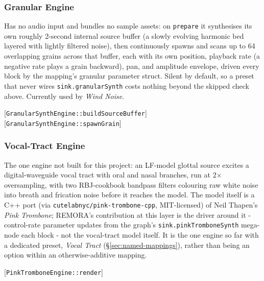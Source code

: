 \documentclass[sigconf,nonacm]{acmart}
\newcommand{\coderef}[1]{{\small [#1]}}
\newcommand{\preset}[1]{\textit{#1}}
\begin{document}
\subsubsection*{Granular Engine}
Has no audio input and bundles no sample assets: on \texttt{prepare} it synthesises its own
roughly 2-second internal source buffer (a slowly evolving harmonic bed layered with lightly
filtered noise), then continuously spawns and scans up to 64 overlapping grains across that buffer,
each with its own position, playback rate (a negative rate plays a grain backward), pan, and
amplitude envelope, driven every block by the mapping's granular parameter struct. Silent by
default, so a preset that never wires \texttt{sink.granularSynth} costs nothing beyond the skipped
check above. Currently used by \preset{Wind Noise}.
\begin{flushright}
\coderef{\texttt{GranularSynthEngine::buildSourceBuffer}}
\coderef{\texttt{GranularSynthEngine::spawnGrain}}
\end{flushright}

\subsubsection*{Vocal-Tract Engine}
The one engine not built for this project: an LF-model glottal source excites a digital-waveguide
vocal tract with oral and nasal branches, run at 2$\times$ oversampling, with two RBJ-cookbook
bandpass filters colouring raw white noise into breath and frication noise before it reaches the
model. The model itself is a C++ port (via \texttt{cutelabnyc/pink-trombone-cpp}, MIT-licensed) of
Neil Thapen's \textit{Pink Trombone}; REMORA's contribution at this layer is the driver around it -
control-rate parameter updates from the graph's \texttt{sink.pinkTromboneSynth} mega-node each
block - not the vocal-tract model itself. It is the one engine so far with a dedicated preset,
\preset{Vocal Tract} (\S\ref{sec:named-mappings}), rather than being an option within an
otherwise-additive mapping.
\begin{flushright}
\coderef{\texttt{PinkTromboneEngine::render}}
\end{flushright}
\end{document}
